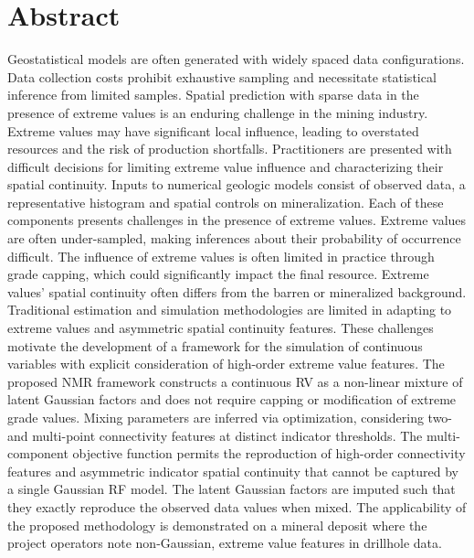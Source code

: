 
\chapter*{Abstract}

\begin{DoubleSpace}
    \linespread{2.0}\selectfont{}

    Geostatistical models are often generated with widely spaced data configurations. Data collection costs prohibit exhaustive sampling and necessitate statistical inference from limited samples. Spatial prediction with sparse data in the presence of extreme values is an enduring challenge in the mining industry. Extreme values may have significant local influence, leading to overstated resources and the risk of production shortfalls. Practitioners are presented with difficult decisions for limiting extreme value influence and characterizing their spatial continuity. Inputs to numerical geologic models consist of observed data, a representative histogram and spatial controls on mineralization. Each of these components presents challenges in the presence of extreme values. Extreme values are often under-sampled, making inferences about their probability of occurrence difficult. The influence of extreme values is often limited in practice through grade capping, which could significantly impact the final resource. Extreme values' spatial continuity often differs from the barren or mineralized background. Traditional estimation and simulation methodologies are limited in adapting to extreme values and asymmetric spatial continuity features. These challenges motivate the development of a framework for the simulation of continuous variables with explicit consideration of high-order extreme value features. The proposed \acrfull{NMR} framework constructs a continuous \gls{RV} as a non-linear mixture of latent Gaussian factors and does not require capping or modification of extreme grade values. Mixing parameters are inferred via optimization, considering two- and multi-point connectivity features at distinct indicator thresholds. The multi-component objective function permits the reproduction of high-order connectivity features and asymmetric indicator spatial continuity that cannot be captured by a single Gaussian \gls{RF} model. The latent Gaussian factors are imputed such that they exactly reproduce the observed data values when mixed. The applicability of the proposed methodology is demonstrated on a mineral deposit where the project operators note non-Gaussian, extreme value features in drillhole data.


\end{DoubleSpace}
